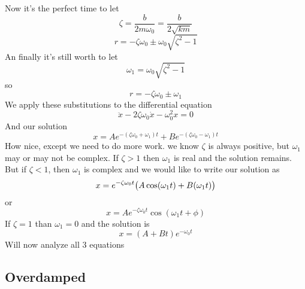 \documentclass{article}
\let\sin\relax
\DeclareMathOperator{\sin}{\smash{\mathrm{sin}}}
\begin{document}
Now it's the perfect time to let
\begin{equation*}
    \zeta = \frac{b}{2m\omega_0} = \frac{b}{2\sqrt{km}}
\end{equation*}
\begin{equation*}
    r = - \zeta\omega_0 \pm \omega_0\sqrt{\zeta^2 - 1}
\end{equation*}
An finally it's still worth to let
\begin{equation*}
    \omega_1 = \omega_0\sqrt{\zeta^2 - 1}
\end{equation*}
so
\begin{equation*}
    r = - \zeta\omega_0 \pm \omega_1
\end{equation*}
We apply these substitutions to the differential equation
\begin{equation*}
    \ddot{x} - 2\zeta\omega_0\dot{x} - \omega_0^2x = 0
\end{equation*}
And our solution
\begin{equation*}
    x = Ae^{-(\zeta\omega_0+\omega_1)t} + Be^{-(\zeta\omega_0-\omega_1)t}
\end{equation*}
How nice, except we need to do more work. we know $\zeta$ is always positive, but $\omega_1$ may or may not be complex. If $\zeta > 1$ then $\omega_1$ is real and the solution remains. But if $\zeta < 1$, then $\omega_1$ is complex and we would like to write our solution as
\begin{equation*}
    x = e^{-\zeta\omega_0t}\big(A\cos(\omega_1t) + B\sin(\omega_1t)\big)
\end{equation*}
or
\begin{equation*}
    x = Ae^{-\zeta\omega_0t}\cos(\omega_1t + \phi)
\end{equation*}
If $\zeta = 1$ than $\omega_1 = 0$ and the solution is
\begin{equation*}
    x = (A + Bt)e^{-\omega_0t}
\end{equation*}
Will now analyze all 3 equations
\subsection{Overdamped}
\end{document}
